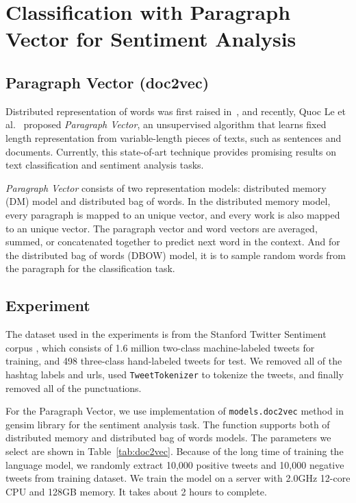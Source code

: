 \section{Classification with Paragraph Vector for Sentiment Analysis}\label{sec.doc2vec}

\subsection{Paragraph Vector (doc2vec)}
Distributed representation of words was first raised in~\cite{rumelhart1988}, and recently, Quoc Le et al.~\cite{le2014} proposed {\textit{Paragraph Vector}}, an unsupervised algorithm that learns fixed length representation from variable-length pieces of texts, such as sentences and documents. Currently, this state-of-art technique provides promising results on text classification and sentiment analysis tasks.

{\textit{Paragraph Vector}} consists of two representation models: distributed memory (DM) model and distributed bag of words. In the distributed memory model, every paragraph is mapped to an unique vector, and every work is also mapped to an unique vector. The paragraph vector and word vectors are averaged, summed, or concatenated together to predict next word in the context. And for the distributed bag of words (DBOW) model, it is to sample random words from the paragraph for the classification task.


\subsection{Experiment}
The dataset used in the experiments is from the Stanford Twitter Sentiment corpus \cite{go2009}, which consists of 1.6 million two-class machine-labeled tweets for training, and 498 three-class hand-labeled tweets for test. We removed all of the hashtag labels and urls, used {\tt TweetTokenizer} to tokenize the tweets, and finally removed all of the punctuations. 

For the Paragraph Vector, we use implementation of {\tt models.doc2vec} method in gensim library for the sentiment analysis task. The function supports both of distributed memory and distributed bag of words models. The parameters we select are shown in Table~\ref{tab:doc2vec}. Because of the long time of training the language model, we randomly extract 10,000 positive tweets and 10,000 negative tweets from training dataset. We train the model on a server with 2.0GHz 12-core CPU and 128GB memory. It takes about 2 hours to complete.

